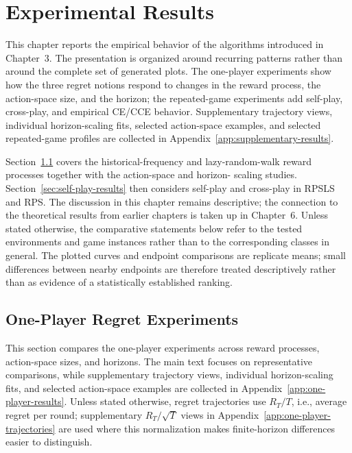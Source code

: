 
\chapter{Experimental Results}
\label{chap:results}

This chapter reports the empirical behavior of the algorithms introduced in
Chapter~3. The presentation is organized around recurring patterns rather than
around the complete set of generated plots. The one-player experiments show
how the three regret notions respond to changes in the reward process, the
action-space size, and the horizon; the repeated-game experiments add self-play,
cross-play, and empirical CE/CCE behavior. Supplementary trajectory views,
individual horizon-scaling fits, selected action-space examples, and selected
repeated-game profiles are collected in
Appendix~\ref{app:supplementary-results}.

Section~\ref{sec:one-player-results} covers the historical-frequency and
lazy-random-walk reward processes together with the action-space and horizon-
scaling studies.
Section~\ref{sec:self-play-results} then considers self-play and cross-play
in RPSLS and RPS. The discussion in this chapter remains descriptive; the
connection to the theoretical results
from earlier chapters is taken up in Chapter~6. Unless stated otherwise, the
comparative statements below refer to the tested environments and game
instances rather than to the corresponding classes in general. The plotted
curves and endpoint comparisons are replicate means; small differences between
nearby endpoints are therefore treated descriptively rather than as evidence
of a statistically established ranking.

\section{One-Player Regret Experiments}
\label{sec:one-player-results}

This section compares the one-player experiments across reward processes,
action-space sizes, and horizons. The main text focuses on representative
comparisons, while supplementary trajectory views, individual horizon-scaling
fits, and selected action-space examples are collected in
Appendix~\ref{app:one-player-results}. Unless stated otherwise, regret
trajectories use $R_T/T$, i.e., average regret per round; supplementary
$R_T/\sqrt{T}$ views in Appendix~\ref{app:one-player-trajectories} are used
where this normalization makes finite-horizon differences easier to distinguish.



